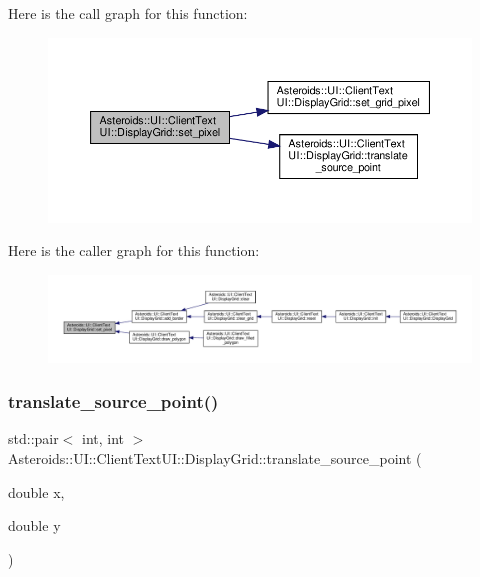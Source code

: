 Here is the call graph for this function\+:\nopagebreak
\begin{figure}[H]
\begin{center}
\leavevmode
\includegraphics[width=350pt]{classAsteroids_1_1UI_1_1ClientTextUI_1_1DisplayGrid_a3f77a0874f78d753020e8ba12081bd85_cgraph}
\end{center}
\end{figure}
Here is the caller graph for this function\+:\nopagebreak
\begin{figure}[H]
\begin{center}
\leavevmode
\includegraphics[width=350pt]{classAsteroids_1_1UI_1_1ClientTextUI_1_1DisplayGrid_a3f77a0874f78d753020e8ba12081bd85_icgraph}
\end{center}
\end{figure}
\mbox{\label{classAsteroids_1_1UI_1_1ClientTextUI_1_1DisplayGrid_ae831e34de9c3fe439b09ed2543e30dee}} 
\subsubsection{\texorpdfstring{translate\+\_\+source\+\_\+point()}{translate\_source\_point()}}
{\footnotesize\ttfamily std\+::pair$<$ int, int $>$ Asteroids\+::\+U\+I\+::\+Client\+Text\+U\+I\+::\+Display\+Grid\+::translate\+\_\+source\+\_\+point (\begin{DoxyParamCaption}\item[{double}]{x,  }\item[{double}]{y }\end{DoxyParamCaption})\hspace{0.3cm}{\ttfamily [private]}}



